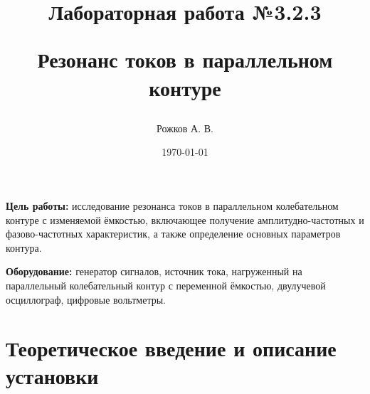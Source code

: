 \documentclass[a4paper, 12pt]{article}
\title{\begin{center}Лабораторная работа №3.2.3\end{center}
Резонанс токов в параллельном контуре}
\author{Рожков А. В.}
\date{\today}
\begin{document}
    \maketitle
    \newpage

    \textbf{Цель работы:} исследование резонанса токов в параллельном колебательном контуре с изменяемой ёмкостью, включающее получение амплитудно-частотных и фазово-частотных характеристик, а также определение основных параметров контура.

    \textbf{Оборудование:} генератор сигналов, источник тока, нагруженный на параллельный колебательный контур с переменной ёмкостью, двулучевой осциллограф, цифровые вольтметры.


    \section{Теоретическое введение и описание установки}
        \begin{figure}[ht]
        \begin{minipage}[ht]{0.49\linewidth}
        \end{minipage}
        \hfill
        \begin{minipage}[ht]{0.49\linewidth}
        \end{minipage}
    \end{figure}
\end{document}
